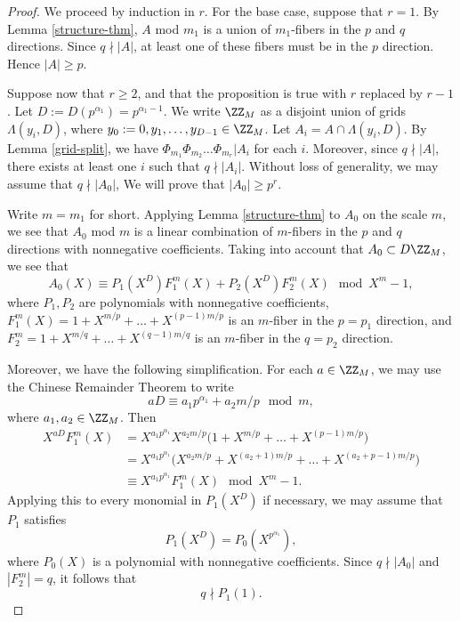 \begin{proof}
We proceed by induction in $r$. For the base case, suppose that $r=1$. By Lemma \ref{structure-thm}, $A$ mod $m_1$ is a union of $m_1$-fibers in the $p$ and $q$ directions. Since $q\nmid |A|$, at least one of these fibers must be in the $p$ direction. Hence $|A|\geq p$. 

Suppose now that $r\geq 2$, and that the proposition is true with $r$ replaced by $r-1$. 
Let $D:=D(p^{\alpha_1})=p^{\alpha_1-1}$. 
We write $\ZZ_M$ as a disjoint union of grids $\Lambda(y_i,D)$, where $y_0:=0,y_1,\dots,y_{D-1}\in\ZZ_M$. 
Let $A_i=A\cap \Lambda(y_i,D)$.
By Lemma \ref{grid-split}, we have $\Phi_{m_1}\Phi_{m_2}\dots \Phi_{m_r}|A_i$ for each $i$. Moreover, since $q\nmid |A|$, there exists at least one $i$ such that $q\nmid |A_i|$. Without loss of generality, we may assume that $q\nmid|A_0|$, We will prove that $|A_0|\geq p^r$.


Write $m=m_1$ for short.
Applying Lemma \ref{structure-thm} to $A_0$ on the scale $m$, we see that $A_0$ mod $m$ is a linear combination of $m$-fibers in the $p$ and $q$ directions with nonnegative coefficients. Taking into account that $A_0\subset D\ZZ_M$, we see that
\begin{equation}\label{A0-decomp}
A_0(X)\equiv P_1(X^D)F^{m}_1(X)+ P_2(X^D)F^{m}_2(X) \mod X^{m}-1,
\end{equation}
where $P_1,P_2$ are polynomials with nonnegative coefficients, $F^{m}_1(X)=1+X^{m/p}+\dots +X^{(p-1)m/p}$ is an $m$-fiber in the $p=p_1$ direction,
and $F^{m}_2=1+X^{m/q}+\dots+X^{(q-1)m/q}$ is an $m$-fiber in the $q=p_2$ direction. 

Moreover, we have the following simplification. For each $a\in\ZZ_M$, we may use the Chinese Remainder Theorem to write 
\begin{equation}\label{decomp-a}
aD\equiv a_1p^{\alpha_1} + a_2m/p\mod m,
\end{equation}
 where $a_1,a_2\in\ZZ_M$. Then
\begin{align*}
X^{aD}F^m_1(X)&=X^{a_1p^{\alpha_1}}X^{a_2m/p}
\Big(1+X^{m/p}+\dots +X^{(p-1)m/p}\Big)
\\
&= X^{a_1p^{\alpha_1}}\Big(X^{a_2m/p}+X^{(a_2+1)m/p}+\dots +X^{(a_2+p-1)m/p}\Big)
\\
&\equiv X^{a_1p^{\alpha_1}}F^m_1(X) \mod X^m-1.
\end{align*}
Applying this to every monomial in $P_1(X^D)$ if necessary, we may assume that $P_1$ satisfies
$$
P_1(X^D)=P_0(X^{p^{\alpha_1}}),
$$
where $P_0(X)$ is a polynomial with nonnegative coefficients.
Since $q\nmid |A_0|$ and $|F^{m}_2|=q$, it follows that 
\begin{equation}\label{qndiv P1}
q\nmid P_1(1).
\end{equation}


\end{proof}
